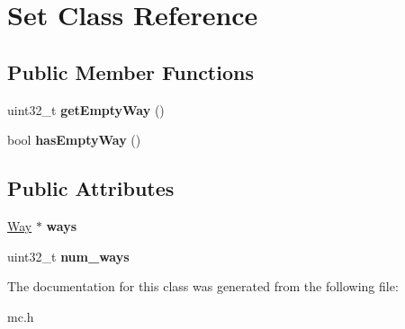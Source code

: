 \hypertarget{classSet}{\section{Set Class Reference}
\label{classSet}
}
\subsection*{Public Member Functions}
\begin{DoxyCompactItemize}
\item 
\hypertarget{classSet_a53dab120610d830cf3198cbd55f9754c}{uint32\-\_\-t {\bfseries get\-Empty\-Way} ()}\label{classSet_a53dab120610d830cf3198cbd55f9754c}

\item 
\hypertarget{classSet_a084c19a407ef56e7d6eaacd23a8c0a89}{bool {\bfseries has\-Empty\-Way} ()}\label{classSet_a084c19a407ef56e7d6eaacd23a8c0a89}

\end{DoxyCompactItemize}
\subsection*{Public Attributes}
\begin{DoxyCompactItemize}
\item 
\hypertarget{classSet_aa6427861bb76845fead1775cafec9eb6}{\hyperlink{classWay}{Way} $\ast$ {\bfseries ways}}\label{classSet_aa6427861bb76845fead1775cafec9eb6}

\item 
\hypertarget{classSet_abd5bb81dea61b28d6b339f74e0a7e528}{uint32\-\_\-t {\bfseries num\-\_\-ways}}\label{classSet_abd5bb81dea61b28d6b339f74e0a7e528}

\end{DoxyCompactItemize}


The documentation for this class was generated from the following file\-:\begin{DoxyCompactItemize}
\item 
mc.\-h\end{DoxyCompactItemize}
